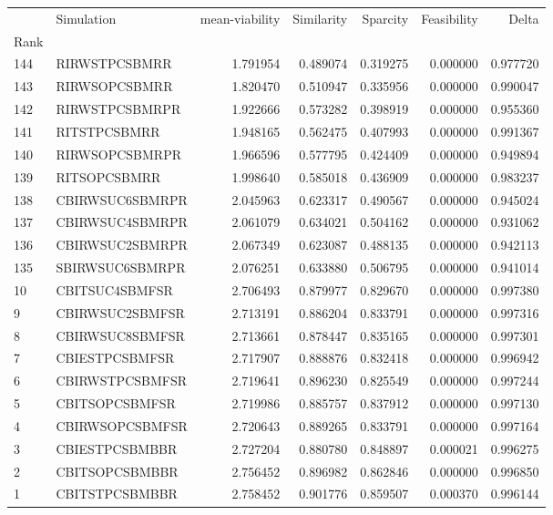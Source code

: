 \begin{tabular}{llrrrrr}
 & Simulation & mean-viability & Similarity & Sparcity & Feasibility & Delta \\
Rank &  &  &  &  &  &  \\
144 & RI\-RWS\-TPC\-SBM\-RR & 1.791954 & 0.489074 & 0.319275 & 0.000000 & 0.977720 \\
143 & RI\-RWS\-OPC\-SBM\-RR & 1.820470 & 0.510947 & 0.335956 & 0.000000 & 0.990047 \\
142 & RI\-RWS\-TPC\-SBM\-RPR & 1.922666 & 0.573282 & 0.398919 & 0.000000 & 0.955360 \\
141 & RI\-TS\-TPC\-SBM\-RR & 1.948165 & 0.562475 & 0.407993 & 0.000000 & 0.991367 \\
140 & RI\-RWS\-OPC\-SBM\-RPR & 1.966596 & 0.577795 & 0.424409 & 0.000000 & 0.949894 \\
139 & RI\-TS\-OPC\-SBM\-RR & 1.998640 & 0.585018 & 0.436909 & 0.000000 & 0.983237 \\
138 & CBI\-RWS\-UC6\-SBM\-RPR & 2.045963 & 0.623317 & 0.490567 & 0.000000 & 0.945024 \\
137 & CBI\-RWS\-UC4\-SBM\-RPR & 2.061079 & 0.634021 & 0.504162 & 0.000000 & 0.931062 \\
136 & CBI\-RWS\-UC2\-SBM\-RPR & 2.067349 & 0.623087 & 0.488135 & 0.000000 & 0.942113 \\
135 & SBI\-RWS\-UC6\-SBM\-RPR & 2.076251 & 0.633880 & 0.506795 & 0.000000 & 0.941014 \\
10 & CBI\-TS\-UC4\-SBM\-FSR & 2.706493 & 0.879977 & 0.829670 & 0.000000 & 0.997380 \\
9 & CBI\-RWS\-UC2\-SBM\-FSR & 2.713191 & 0.886204 & 0.833791 & 0.000000 & 0.997316 \\
8 & CBI\-RWS\-UC8\-SBM\-FSR & 2.713661 & 0.878447 & 0.835165 & 0.000000 & 0.997301 \\
7 & CBI\-ES\-TPC\-SBM\-FSR & 2.717907 & 0.888876 & 0.832418 & 0.000000 & 0.996942 \\
6 & CBI\-RWS\-TPC\-SBM\-FSR & 2.719641 & 0.896230 & 0.825549 & 0.000000 & 0.997244 \\
5 & CBI\-TS\-OPC\-SBM\-FSR & 2.719986 & 0.885757 & 0.837912 & 0.000000 & 0.997130 \\
4 & CBI\-RWS\-OPC\-SBM\-FSR & 2.720643 & 0.889265 & 0.833791 & 0.000000 & 0.997164 \\
3 & CBI\-ES\-TPC\-SBM\-BBR & 2.727204 & 0.880780 & 0.848897 & 0.000021 & 0.996275 \\
2 & CBI\-TS\-OPC\-SBM\-BBR & 2.756452 & 0.896982 & 0.862846 & 0.000000 & 0.996850 \\
1 & CBI\-TS\-TPC\-SBM\-BBR & 2.758452 & 0.901776 & 0.859507 & 0.000370 & 0.996144 \\
\end{tabular}
